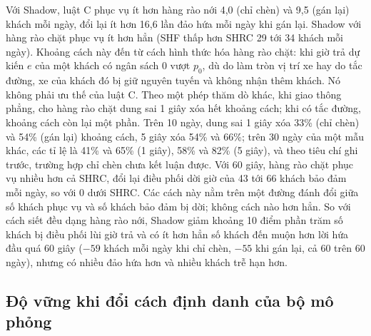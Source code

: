 Với Shadow, luật C phục vụ ít hơn hàng rào nới 4,0 (chỉ chèn) và 9,5 (gán lại) khách mỗi ngày, đổi lại ít hơn 16,6 lần
đảo hứa mỗi ngày khi gán lại. Shadow với hàng rào chặt phục vụ ít hơn hẳn (SHF thấp hơn SHRC 29 tới 34 khách mỗi ngày).
Khoảng cách này đến từ cách hình thức hóa hàng rào chặt: khi giờ trả dự kiến $e$ của một khách có ngân sách 0 vượt $p_0$,
dù do làm tròn vị trí xe hay do tắc đường, xe của khách đó bị giữ nguyên tuyến và không nhận thêm khách. Nó không phải ưu
thế của luật C. Theo một phép thăm dò khác, khi giao thông phẳng, cho hàng rào chặt dung sai 1 giây xóa hết khoảng cách;
khi có tắc đường, khoảng cách còn lại một phần. Trên 10 ngày, dung sai 1 giây xóa 33\% (chỉ chèn) và 54\% (gán lại) khoảng
cách, 5 giây xóa 54\% và 66\%; trên 30 ngày của một mẫu khác, các tỉ lệ là 41\% và 65\% (1 giây), 58\% và 82\% (5 giây), và
theo tiêu chí ghi trước, trường hợp chỉ chèn chưa kết luận được. Với 60 giây, hàng rào chặt phục vụ nhiều hơn cả SHRC, đổi
lại điều phối dời giờ của 43 tới 66 khách bảo đảm mỗi ngày, so với 0 dưới SHRC. Các cách này nằm trên một đường đánh đổi
giữa số khách phục vụ và số khách bảo đảm bị dời; không cách nào hơn hẳn. So với cách siết đều dạng hàng rào nới, Shadow
giảm khoảng 10 điểm phần trăm số khách bị điều phối lùi giờ trả và có ít hơn hẳn số khách đến muộn hơn lời hứa đầu quá 60
giây ($-59$ khách mỗi ngày khi chỉ chèn, $-55$ khi gán lại, cả 60 trên 60 ngày), nhưng có nhiều đảo hứa hơn và nhiều khách
trễ hạn hơn.

\subsection{Độ vững khi đổi cách định danh của bộ mô phỏng}
\label{muc:c4-via-dinhdanh}

